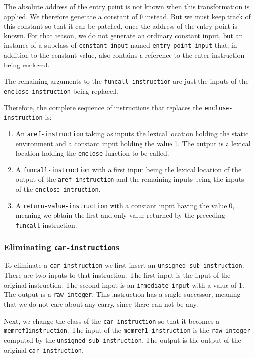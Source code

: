 The absolute address of the entry point is not known when this
transformation is applied.  We therefore generate a constant of 0
instead.  But we must keep track of this constant so that it can be
patched, once the address of the entry point is known.  For that
reason, we do not generate an ordinary constant input, but an instance
of a subclass of \texttt{constant-input} named
\texttt{entry-point-input} that, in addition to the constant value,
also contains a reference to the enter instruction being enclosed.

The remaining arguments to the \texttt{funcall-instruction} are just
the inputs of the \texttt{enclose-instruction} being replaced.

Therefore, the complete sequence of instructions that replaces the
\texttt{enclose-instruction} is:

\begin{enumerate}
\item An \texttt{aref-instruction} taking as inputs the lexical
  location holding the static environment and a constant input holding
  the value 1.  The output is a lexical location holding the
  \texttt{enclose} function to be called.
\item A \texttt{funcall-instruction} with a first input being the
  lexical location of the output of the \texttt{aref-instruction} and
  the remaining inputs being the inputs of the
  \texttt{enclose-intruction}.
\item A \texttt{return-value-instruction} with a constant input having
  the value $0$, meaning we obtain the first and only value returned
  by the preceding \texttt{funcall} instruction.
\end{enumerate}

\subsubsection{Eliminating \texttt{car-instruction}s}

To eliminate a \texttt{car-instruction} we first insert an
\texttt{unsigned-sub-instruction}.  There are two inputs to that
instruction.  The first input is the input of the original
instruction.  The second input is an \texttt{immediate-input} with a
value of 1.  The output is a \texttt{raw-integer}.  This instruction
has a single successor, meaning that we do not care about any carry,
since there can not be any.

Next, we change the class of the \texttt{car-instruction} so that it
becomes a \texttt{memref1\-instruction}.  The input of the
\texttt{memref1-instruction} is the \texttt{raw-integer} computed by
the \texttt{unsigned-sub-instruction}.  The output is the output of
the original \texttt{car-instruction}.

